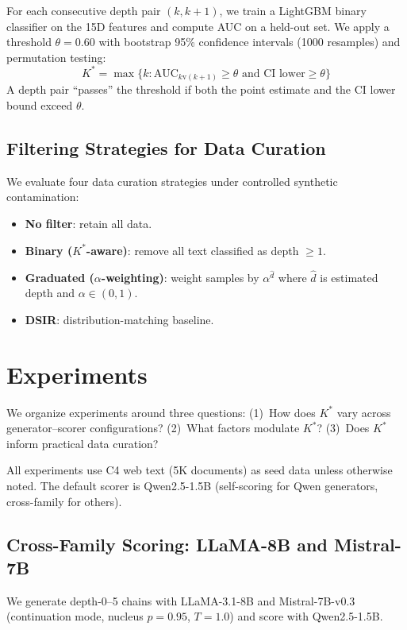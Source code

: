 \documentclass[11pt,a4paper]{article}
\newcommand{\kstar}{K^{*}}
\begin{document}
For each consecutive depth pair $(k, k{+}1)$, we train a LightGBM binary classifier on the 15D features and compute AUC on a held-out set.
We apply a threshold $\theta = 0.60$ with bootstrap 95\% confidence intervals (1000 resamples) and permutation testing:
\[
\kstar = \max\{k : \text{AUC}_{k \text{v} (k+1)} \geq \theta \text{ and CI lower} \geq \theta\}
\]
A depth pair ``passes'' the threshold if both the point estimate and the CI lower bound exceed $\theta$.

\subsection{Filtering Strategies for Data Curation}

We evaluate four data curation strategies under controlled synthetic contamination:
\begin{itemize}
    \item \textbf{No filter}: retain all data.
    \item \textbf{Binary ($\kstar$-aware)}: remove all text classified as depth $\geq 1$.
    \item \textbf{Graduated ($\alpha$-weighting)}: weight samples by $\alpha^{\hat{d}}$ where $\hat{d}$ is estimated depth and $\alpha \in (0,1)$.
    \item \textbf{DSIR}: distribution-matching baseline.
\end{itemize}

\section{Experiments}
\label{sec:experiments}

We organize experiments around three questions: (1)~How does $\kstar$ vary across generator--scorer configurations? (2)~What factors modulate $\kstar$? (3)~Does $\kstar$ inform practical data curation?

All experiments use C4 web text (5K documents) as seed data unless otherwise noted.
The default scorer is Qwen2.5-1.5B (self-scoring for Qwen generators, cross-family for others).

\subsection{Cross-Family Scoring: LLaMA-8B and Mistral-7B}
\label{sec:cross_family}

We generate depth-0--5 chains with LLaMA-3.1-8B and Mistral-7B-v0.3 (continuation mode, nucleus $p = 0.95$, $T = 1.0$) and score with Qwen2.5-1.5B.
\end{document}
